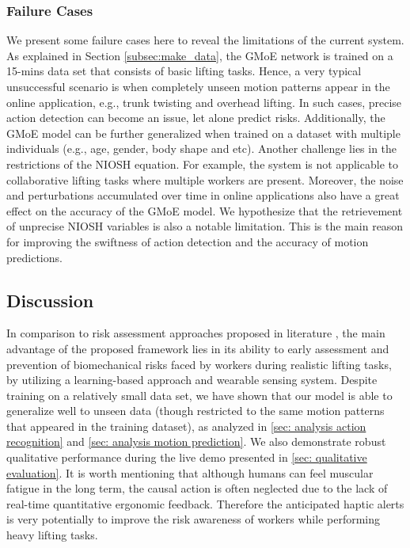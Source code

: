 \subsubsection{Failure Cases}
We present some failure cases here to reveal the limitations of the current system. As explained in Section \ref{subsec:make_data}, the GMoE network is trained on a 15-mins data set that consists of basic lifting tasks. Hence, a very typical unsuccessful scenario is when completely unseen motion patterns appear in the online application, e.g., trunk twisting and overhead lifting. In such cases, precise action detection can become an issue, let alone predict risks. Additionally, the GMoE model can be further generalized when trained on a dataset with multiple individuals (e.g., age, gender, body shape and etc). Another challenge lies in the restrictions of the NIOSH equation.  For example, the system is not applicable to collaborative lifting tasks where multiple workers are present. Moreover, the noise and perturbations accumulated over time in online applications also have a great effect on the accuracy of the GMoE model. We hypothesize that the retrievement of unprecise NIOSH variables is also a notable limitation. This is the main reason for improving the swiftness of action detection and the accuracy of motion predictions. 


\subsection{Discussion}
In comparison to risk assessment approaches proposed in literature \cite{Shafti2019, Fortini2020ROMAN, fortini2020framework}, the main advantage of the proposed framework lies in its ability to early assessment and prevention of biomechanical risks faced by workers during realistic lifting tasks, by utilizing a learning-based approach and wearable sensing system. Despite training on a relatively small data set, we have shown that our model is able to generalize well to unseen data (though restricted to the same motion patterns that appeared in the training dataset), as analyzed in \ref{sec: analysis action recognition} and \ref{sec: analysis motion prediction}. We also demonstrate robust qualitative performance during the live demo presented in \ref{sec: qualitative evaluation}. It is worth mentioning that although humans can feel muscular fatigue in the long term, the causal action is often neglected due to the lack of real-time quantitative ergonomic feedback. Therefore the anticipated haptic alerts is very potentially to improve the risk awareness of workers while performing heavy lifting tasks.








